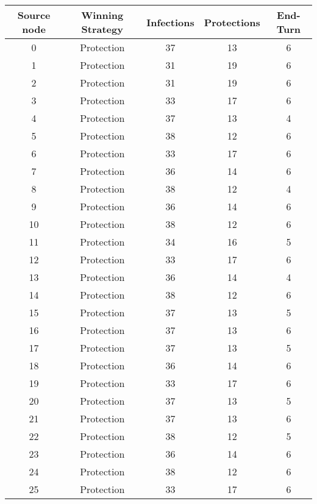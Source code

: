 \documentclass[results.tex]{subfiles}
\begin{document}
\begin{center}
  \begin{tabular}{| c || c | c | c | c |}
    \hline
    {\bfseries Source node} & {\bfseries Winning Strategy} & {\bfseries Infections} & {\bfseries Protections} & {\bfseries End-Turn} \\  %
    \hline\hline
    0 & Protection & 37 & 13 & 6 \\ 
    \hline
    1 & Protection & 31 & 19 & 6 \\ 
    \hline
    2 & Protection & 31 & 19 & 6 \\ 
    \hline
    3 & Protection & 33 & 17 & 6 \\ 
    \hline
    4 & Protection & 37 & 13 & 4 \\ 
    \hline
    5 & Protection & 38 & 12 & 6 \\ 
    \hline
    6 & Protection & 33 & 17 & 6 \\ 
    \hline
    7 & Protection & 36 & 14 & 6 \\ 
    \hline
    8 & Protection & 38 & 12 & 4 \\ 
    \hline
    9 & Protection & 36 & 14 & 6 \\ 
    \hline
    10 & Protection & 38 & 12 & 6 \\ 
    \hline
    11 & Protection & 34 & 16 & 5 \\ 
    \hline
    12 & Protection & 33 & 17 & 6 \\ 
    \hline
    13 & Protection & 36 & 14 & 4 \\ 
    \hline
    14 & Protection & 38 & 12 & 6 \\ 
    \hline
    15 & Protection & 37 & 13 & 5 \\ 
    \hline
    16 & Protection & 37 & 13 & 6 \\ 
    \hline
    17 & Protection & 37 & 13 & 5 \\ 
    \hline
    18 & Protection & 36 & 14 & 6 \\ 
    \hline
    19 & Protection & 33 & 17 & 6 \\ 
    \hline
    20 & Protection & 37 & 13 & 5 \\ 
    \hline
    21 & Protection & 37 & 13 & 6 \\ 
    \hline
    22 & Protection & 38 & 12 & 5 \\ 
    \hline
    23 & Protection & 36 & 14 & 6 \\ 
    \hline
    24 & Protection & 38 & 12 & 6 \\ 
    \hline
    25 & Protection & 33 & 17 & 6 \\ 

\end{tabular}
\end{center}
\end{document}
